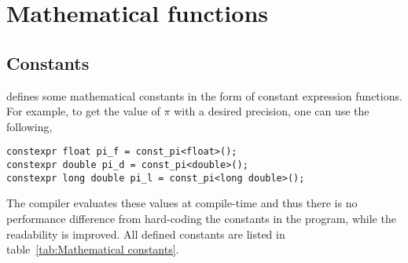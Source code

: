 %
%
%
%

\chapter{Mathematical functions}
\label{chap:Mathemtical functions}

\section{Constants}
\label{sec:Constants}

\mckl defines some mathematical constants in the form of constant expression
functions. For example, to get the value of $\pi$ with a desired precision, one
can use the following,
\begin{verbatim}
constexpr float pi_f = const_pi<float>();
constexpr double pi_d = const_pi<double>();
constexpr long double pi_l = const_pi<long double>();
\end{verbatim}
The compiler evaluates these values at compile-time and thus there is no
performance difference from hard-coding the constants in the program, while the
readability is improved. All defined constants are listed in
table~\ref{tab:Mathematical constants}.

